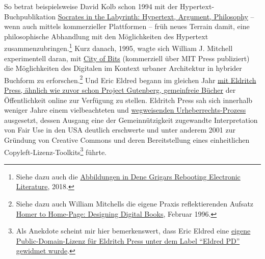 \documentclass[a4paper,
fontsize=11pt,
oneside,
numbers=noperiodatend,
parskip=half-,
bibliography=totoc,
final
]{scrartcl}
\begin{document}
So betrat beispielsweise David Kolb schon 1994 mit der
Hypertext-Buchpublikation
\href{http://www.eastgate.com/catalog/Socrates.html}{Socrates in the
Labyrinth: Hypertext, Argument, Philosophy} -- wenn auch mittels
kommerzieller Plattformen -- früh neues Terrain damit, eine
philosophische Abhandlung mit den Möglichkeiten des Hypertext
zusammenzubringen.\footnote{Siehe dazu auch die
  \href{https://scalar.usc.edu/works/rebooting-electronic-literature/photos-of-david-kolbs-socrates-in-the-labyrinth}{Abbildungen
  in Dene Grigars Rebooting Electronic Literature}, 2018.} Kurz danach,
1995, wagte sich William J. Mitchell experimentell daran, mit
\href{https://mitpress.mit.edu/9780262631761/city-of-bits/}{City of
Bits} (kommerziell über MIT Press publiziert) die Möglichkeiten des
Digitalen im Kontext urbaner Architektur in hybrider Buchform zu
erforschen.\footnote{Siehe dazu auch William Mitchells die eigene Praxis
  reflektierenden Aufsatz
  \href{http://mitpress2.mit.edu/e-books/City_of_Bits/Text_Unbound/text_unbound.html}{Homer
  to Home-Page: Designing Digital Books}, Februar 1996.} Und Eric Eldred
begann im gleichen Jahr
\href{https://firstmonday.org/ojs/index.php/fm/article/view/1059/979}{mit
Eldritch Press, ähnlich wie zuvor schon Project Gutenberg, gemeinfreie
Bücher} der Öffentlichkeit online zur Verfügung zu stellen. Eldritch
Press sah sich innerhalb weniger Jahre einem vielbeachteten und
\href{https://archive.nytimes.com/www.nytimes.com/library/tech/99/01/cyber/cyberlaw/15law.html}{wegweisenden
Urheberrechts-Prozess} ausgesetzt, dessen Ausgang eine der
Gemeinnützigkeit zugewandte Interpretation von Fair Use in den USA
deutlich erschwerte und unter anderem 2001 zur Gründung von Creative
Commons und deren Bereitstellung eines einheitlichen
Copyleft-Lizenz-Toolkits\footnote{Als Anekdote scheint mir hier
  bemerkenswert, dass Eric Eldred eine
  \href{https://web.archive.org/web/20030115160926/http://www.creativecommons.org/licenses/eldred-pd}{eigene
  Public-Domain-Lizenz für Eldritch Press unter dem Label
  \enquote{Eldred PD} gewidmet wurde}.} führte.
\end{document}
